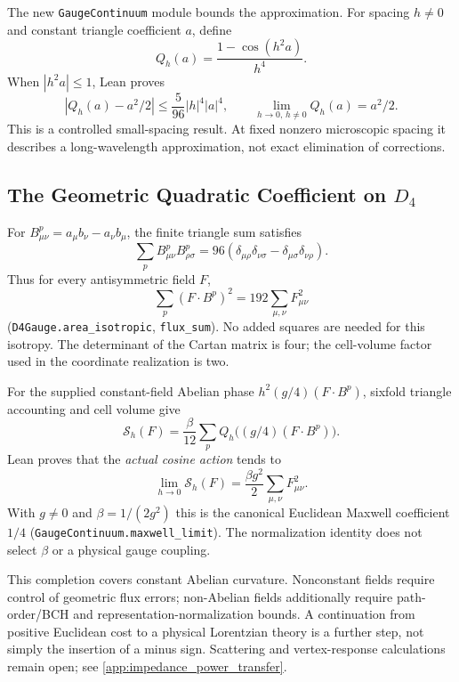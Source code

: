 The new \nolinkurl{GaugeContinuum} module bounds the approximation. For spacing $h\ne0$ and constant triangle coefficient $a$, define
\begin{equation}
 Q_h(a)=\frac{1-\cos(h^2a)}{h^4}.
\end{equation}
When $|h^2a|\leq1$, Lean proves
\begin{equation}
 |Q_h(a)-a^2/2|\leq\frac5{96}|h|^4|a|^4,
 \qquad \lim_{h\to0,\,h\ne0}Q_h(a)=a^2/2.
\end{equation}
This is a controlled small-spacing result. At fixed nonzero microscopic spacing it describes a long-wavelength approximation, not exact elimination of corrections.

\subsection{The Geometric Quadratic Coefficient on \texorpdfstring{$D_4$}{D4}}
For $B^p_{\mu\nu}=a_\mu b_\nu-a_\nu b_\mu$, the finite triangle sum satisfies
\begin{equation}
 \sum_p B^p_{\mu\nu}B^p_{\rho\sigma}
 =96(\delta_{\mu\rho}\delta_{\nu\sigma}-\delta_{\mu\sigma}\delta_{\nu\rho}).
\end{equation}
Thus for every antisymmetric field $F$,
\begin{equation}
 \sum_p(F\mathbin{\cdot}B^p)^2=192\sum_{\mu,\nu}F_{\mu\nu}^2
\end{equation}
(\nolinkurl{D4Gauge.area_isotropic}, \nolinkurl{flux_sum}). No added squares are needed for this isotropy. The determinant of the Cartan matrix is four; the cell-volume factor used in the coordinate realization is two.

For the supplied constant-field Abelian phase $h^2(g/4)(F\mathbin{\cdot}B^p)$, sixfold triangle accounting and cell volume give
\begin{equation}
 \mathcal S_h(F)=\frac{\beta}{12}\sum_p Q_h\bigl((g/4)(F\mathbin{\cdot}B^p)\bigr).
\end{equation}
Lean proves that the \emph{actual cosine action} tends to
\begin{equation}
 \lim_{h\to0}\mathcal S_h(F)=\frac{\beta g^2}{2}\sum_{\mu,\nu}F_{\mu\nu}^2.
\end{equation}
With $g\ne0$ and $\beta=1/(2g^2)$ this is the canonical Euclidean Maxwell coefficient $1/4$ (\nolinkurl{GaugeContinuum.maxwell_limit}). The normalization identity does not select $\beta$ or a physical gauge coupling.

This completion covers constant Abelian curvature. Nonconstant fields require control of geometric flux errors; non-Abelian fields additionally require path-order/BCH and representation-normalization bounds. A continuation from positive Euclidean cost to a physical Lorentzian theory is a further step, not simply the insertion of a minus sign. Scattering and vertex-response calculations remain open; see \cref{app:impedance_power_transfer}.


